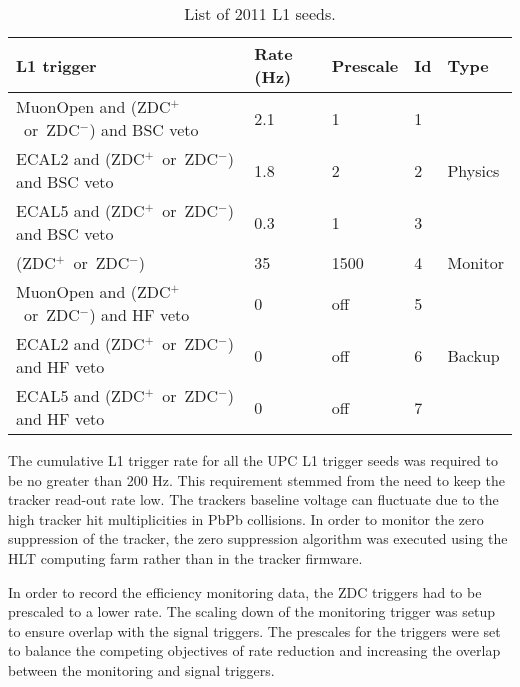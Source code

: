       \begin{table}[h]
        \centering
        \begin{tabular}{|l|l|l|l|l|}
          \hline L1 trigger & Rate (Hz) & Prescale & Id & Type \\ \hline \hline
          MuonOpen and (ZDC$^{+}$~or~ZDC$^{-}$) and BSC veto & 2.1 & 1 & 1 & \multirow{3}{*}{Physics} \\  \hhline{----~}
          ECAL2 and (ZDC$^{+}$~or~ZDC$^{-}$) and BSC veto & 1.8 & 2 & 2 & \\  \hhline{----~}
          ECAL5 and (ZDC$^{+}$~or~ZDC$^{-}$) and BSC veto & 0.3 & 1 & 3 & \\  \hline
          (ZDC$^{+}$~or~ZDC$^{-}$) & 35 & 1500 & 4 & Monitor \\  \hline
          MuonOpen and (ZDC$^{+}$~or~ZDC$^{-}$) and HF veto & 0 & off & 5 & \multirow{3}{*}{Backup} \\ \hhline{----~}
          ECAL2 and (ZDC$^{+}$~or~ZDC$^{-}$) and HF veto & 0 & off & 6 & \\  \hhline{----~}
          ECAL5 and (ZDC$^{+}$~or~ZDC$^{-}$) and HF veto & 0 & off & 7 & \\  \hline
        \end{tabular}
        \caption{List of 2011 L1 seeds.}
        \label{tab:l1Triggers2011}
      \end{table}
      The cumulative L1 trigger rate for all the UPC L1 trigger seeds was
        required to be no greater than 200 Hz.
      This requirement stemmed from the need to keep the tracker read-out rate
        low. 
      The trackers baseline voltage can fluctuate due to the high tracker hit 
        multiplicities in PbPb collisions.
      In order to monitor the zero suppression of the tracker, the zero 
        suppression algorithm was executed using the HLT computing farm 
	      rather than in the tracker firmware.

      In order to record the efficiency monitoring data, the ZDC triggers had 
        to be prescaled to a lower rate. 
      The scaling down of the monitoring trigger was setup to ensure overlap
        with the signal triggers.
      The prescales for the triggers were set to balance the competing objectives 
        of rate reduction and increasing the overlap between the monitoring and
        signal triggers.

